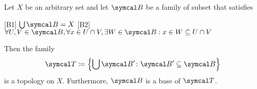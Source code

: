 \begin{proposition}\label{thm:topological_base_axioms}\cite[12]{Engelking1989}
  Let \( X \) be an arbitrary set and let \( \Cal{B} \) be a family of subset that satisfies
  \begin{description}
    [B1] \( \bigcup \Cal{B} = X \)
    [B2] \( \forall U, V \in \Cal{B}, \forall x \in U \cap V, \exists W \in \Cal{B}: x \in W \subseteq U \cap V \)
  \end{description}

  Then the family
  \begin{align}\label{thm:topological_base_axioms/topology}
    \Cal{T} \coloneqq \left\{ \bigcup \Cal{B}' \colon \Cal{B}' \subseteq \Cal{B} \right\}
  \end{align}
  is a topology on \( X \). Furthermore, \( \Cal{B} \) is a base of \( \Cal{T} \).
\end{proposition}
